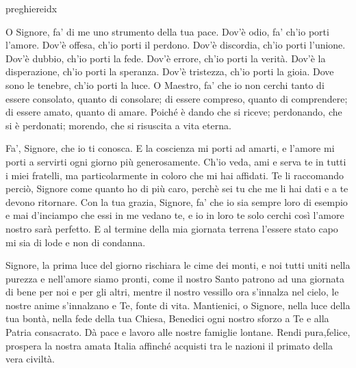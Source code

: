 \documentclass[a4paper,12pt, twoside]{article}
\begin{document}
\begin{songs}{preghiereidx}
\endverse
\endsong

\begin{intersong}
\bigskip
\end{intersong}


\beginverse
O Signore, fa’ di me uno strumento della tua pace.
Dov’è odio, fa’ ch’io porti l’amore.
Dov’è offesa, ch’io porti il perdono.
Dov’è discordia, ch’io porti l’unione.
Dov’è dubbio, ch’io porti la fede.
Dov’è errore, ch’io porti la verità.
Dov’è la disperazione, ch’io porti la speranza.
Dov’è tristezza, ch’io porti la gioia.
Dove sono le tenebre, ch’io porti la luce.
O Maestro, fa’ che io non cerchi tanto
di essere consolato, quanto di consolare;
di essere compreso, quanto di comprendere;
di essere amato, quanto di amare.
Poiché è dando che si riceve;
perdonando, che si è perdonati;
morendo, che si risuscita a vita eterna.

\endverse
\endsong

\beginverse
Fa’, Signore, che io ti conosca.
E la coscienza mi porti ad amarti,
e l’amore mi porti a servirti ogni giorno più generosamente.
Ch’io veda, ami e serva te in tutti i miei fratelli,
ma particolarmente in coloro che mi hai affidati.
Te li raccomando perciò, Signore
come quanto ho di più caro,
perchè sei tu che me li hai dati
e a te devono ritornare.
Con la tua grazia, Signore,
fa’ che io sia sempre loro di esempio e mai d’inciampo
che essi in me vedano te, e io in loro te solo cerchi
così l’amore nostro sarà perfetto.
E al termine della mia giornata terrena
l’essere stato capo mi sia di lode e non di condanna.

\endverse
\endsong

\begin{intersong}
\bigskip
\end{intersong}



\beginverse
Signore, la prima luce del giorno rischiara le cime dei monti,
e noi tutti uniti nella purezza e nell’amore siamo pronti,
come il nostro Santo patrono ad una giornata di bene per noi e per 
gli altri, mentre il nostro vessillo ora s’innalza nel cielo,
le nostre anime s’innalzano e Te, fonte di vita.
Mantienici, o Signore, nella luce della tua bontà,
nella fede della tua Chiesa,
Benedici ogni nostro sforzo a Te e alla Patria consacrato.
Dà pace e lavoro alle nostre famiglie lontane.
Rendi pura,felice, prospera
la nostra amata Italia
affinché acquisti tra le nazioni il primato della vera civiltà.
\endverse
\endsong


\end{songs}
\end{document}
